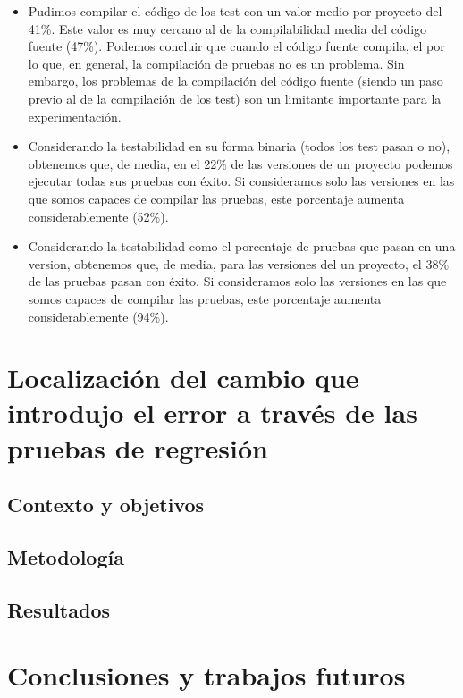 \begin{itemize}
    \item Pudimos compilar el código de los test con un valor medio por proyecto del 41\%. Este valor es muy cercano al de la compilabilidad media del código fuente (47\%). Podemos concluir que cuando el código fuente compila, el por lo que, en general, la compilación de pruebas no es un problema. Sin embargo, los problemas de la compilación del código fuente (siendo un paso previo al de la compilación de los test) son un limitante importante para la experimentación.
    \item Considerando la testabilidad en su forma binaria (todos los test pasan o no), obtenemos que, de media, en el 22\% de las versiones de un proyecto podemos ejecutar todas sus pruebas con éxito. Si consideramos solo las versiones en las que somos capaces de compilar las pruebas, este porcentaje aumenta considerablemente (52\%).
    \item Considerando la testabilidad como el porcentaje de pruebas que pasan en una version, obtenemos que, de media, para las versiones del un proyecto, el 38\% de las pruebas pasan con éxito. Si consideramos solo las versiones en las que somos capaces de compilar las pruebas, este porcentaje aumenta considerablemente (94\%). 
\end{itemize}


\section{Localización del cambio que introdujo el error a través de las pruebas de regresión}
\label{sec:resumen:bug-hunter}

\subsection{Contexto y objetivos}

\subsection{Metodología}

\subsection{Resultados}

\section{Conclusiones y trabajos futuros}
\label{sec:resumen:conclusiones}

